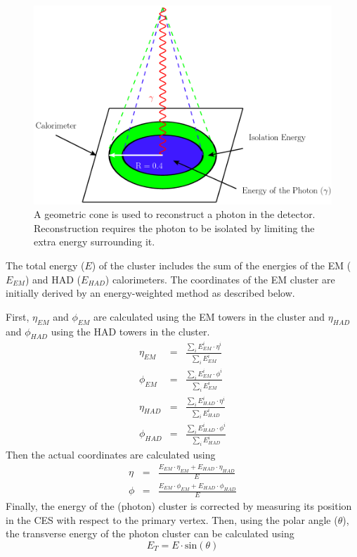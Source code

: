 \begin{figure}[htb!]
 \centering
 \includegraphics[scale=0.35,keepaspectratio=true]{./PhotonIsolationDemo.png}
 \caption{A geometric cone is used to reconstruct a photon in the detector. Reconstruction requires the photon to be isolated by limiting the extra energy surrounding it.}
 \label{fig:PhotonIsoCone}
\end{figure}

The total energy ($E$) of the cluster includes the sum of the energies of the EM ($E_{EM}$) and HAD ($E_{HAD}$) calorimeters. The coordinates of the EM cluster are initially derived by an energy-weighted method as described below.

First, $\eta_{EM}$ and $\phi_{EM}$ are calculated using the EM towers in the cluster and $\eta_{HAD}$ and $\phi_{HAD}$ using the HAD towers in the cluster.
\begin{eqnarray}
 \eta_{EM} &=& \frac{\sum_{i}E^{i}_{EM}\cdot\eta^{i}}{\sum_{i}E^{i}_{EM}}\\
 \phi_{EM} &=& \frac{\sum_{i}E^{i}_{EM}\cdot\phi^{i}}{\sum_{i}E^{i}_{EM}}\\
 \eta_{HAD} &=& \frac{\sum_{i}E^{i}_{HAD}\cdot\eta^{i}}{\sum_{i}E^{i}_{HAD}}\\
 \phi_{HAD} &=& \frac{\sum_{i}E^{i}_{HAD}\cdot\phi^{i}}{\sum_{i}E^{i}_{HAD}}
\end{eqnarray}
Then the actual coordinates are calculated using
\begin{eqnarray}
 \eta &=& \frac{E_{EM}\cdot\eta_{EM}+E_{HAD}\cdot\eta_{HAD}}{E}\\
 \phi &=& \frac{E_{EM}\cdot\phi_{EM}+E_{HAD}\cdot\phi_{HAD}}{E}
\end{eqnarray}
Finally, the energy of the (photon) cluster is corrected by measuring its position in the CES with respect to the primary vertex. Then, using the polar angle ($\theta$), the transverse energy of the photon cluster can be calculated using
\begin{equation}
 E_{T} = E\cdot\mathrm{sin}(\theta)
\end{equation}

